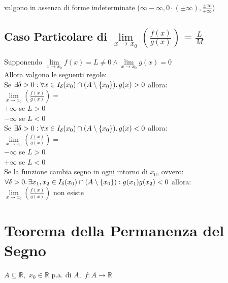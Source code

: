 \documentclass[a4paper, twoside, italian, 11pt]{book}
\newcommand{\braces}[1] {\left \{ #1 \right \}}
\newcommand{\R}{\mathbb{R}}
\begin{document}
\noindent
valgono in assenza di forme indeterminate ($\infty - \infty, 0 \cdot (\pm \infty), \frac{\pm \infty}{\pm \infty}$)


\subsection{Caso Particolare di $\lim\limits_{x \to x_0} (\frac{f(x)}{g(x)}) = \frac{L}{M}$}

\noindent
Supponendo $\lim\limits_{x \to x_0} f(x) = L \neq 0 \land \lim\limits_{x \to x_0} g(x) = 0$ \\

\noindent
Allora valgono le seguenti regole: \\

\noindent
Se $\exists \delta > 0 : \forall x \in I_\delta(x_0) \cap (A \setminus \braces{x_0}) \ldotp g(x) > 0$ allora: \\

\noindent
$\lim\limits_{x \to x_0} (\frac{f(x)}{g(x)}) =$ \\

\noindent
$+\infty$ se $L > 0$ \\
$-\infty$ se $L < 0$ \\

\noindent
Se $\exists \delta > 0 : \forall x \in I_\delta(x_0) \cap (A \setminus \braces{x_0}) \ldotp g(x) < 0$ allora: \\

\noindent
$\lim\limits_{x \to x_0} (\frac{f(x)}{g(x)}) =$ \\

\noindent
$-\infty$ se $L > 0$ \\
$+\infty$ se $L < 0$ \\

\noindent
Se la funzione cambia segno in \underline{ogni} intorno di $x_0$, ovvero: \\
$\forall \delta > 0 \ldotp \exists x_1, x_2 \in I_\delta(x_0) \cap (A \setminus \braces{x_0}) : g(x_1)g(x_2) < 0$ allora: \\

\noindent
$\lim\limits_{x \to x_0} (\frac{f(x)}{g(x)})$ non esiste



\section{Teorema della Permanenza del Segno}

\noindent
$A \subseteq \R,$ $x_0 \in \R$ p.a. di $A,$ $f : A \rightarrow \R$ \\
\end{document}
